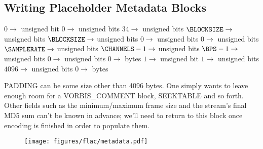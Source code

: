 \clearpage

\subsection{Writing Placeholder Metadata Blocks}
\label{flac:write_placeholder_blocks}
$0 \rightarrow$  unsigned bit
$0 \rightarrow$  unsigned bits
$34 \rightarrow$  unsigned bits
$\BLOCKSIZE \rightarrow$  unsigned bits
$\BLOCKSIZE \rightarrow$  unsigned bits
$0 \rightarrow$  unsigned bits
$0 \rightarrow$  unsigned bits
$\SAMPLERATE \rightarrow$  unsigned bits\;
$\CHANNELS - 1 \rightarrow$  unsigned bits\;
$\BPS - 1 \rightarrow$  unsigned bits\;
$0 \rightarrow$  unsigned bits
$0 \rightarrow$  bytes
\BlankLine
\BlankLine
$1 \rightarrow$  unsigned bit
$1 \rightarrow$  unsigned bits
$4096 \rightarrow$  unsigned bits
$0 \rightarrow$  bytes
\EALGORITHM
\par
\noindent
PADDING can be some size other than 4096 bytes.
One simply wants to leave enough room for a VORBIS\_COMMENT block,
SEEKTABLE and so forth.
Other fields such as the minimum/maximum frame size
and the stream's final MD5 sum can't be known in advance;
we'll need to return to this block once encoding is finished
in order to populate them.
\begin{figure}[h]
\texttt{[image: figures/flac/metadata.pdf]}
\end{figure}


\clearpage

